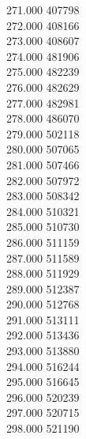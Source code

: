 { 271.000	407798 \\
 272.000	408166 \\
 273.000	408607 \\
 274.000	481906 \\
 275.000	482239 \\
 276.000	482629 \\
 277.000	482981 \\
 278.000	486070 \\
 279.000	502118 \\
 280.000	507065 \\
 281.000	507466 \\
 282.000	507972 \\
 283.000	508342 \\
 284.000	510321 \\
 285.000	510730 \\
 286.000	511159 \\
 287.000	511589 \\
 288.000	511929 \\
 289.000	512387 \\
 290.000	512768 \\
 291.000	513111 \\
 292.000	513436 \\
 293.000	513880 \\
 294.000	516244 \\
 295.000	516645 \\
 296.000	520239 \\
 297.000	520715 \\
 298.000	521190 \\
}
